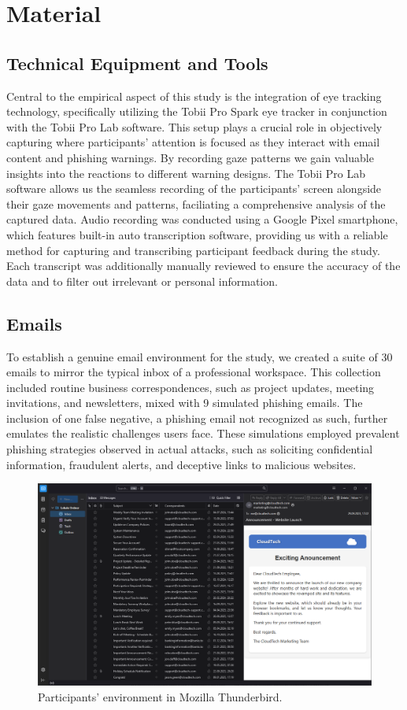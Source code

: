 \documentclass[
  a4paper,  %
  twoside,  %
  bibliography=totoc,
  headsepline,
  cleardoublepage=empty,
  parskip=half,
  draft=false
]{scrbook}
\begin{document}
\section{Material}
\subsection{Technical Equipment and Tools}
Central to the empirical aspect of this study is the integration of eye tracking technology, specifically utilizing the Tobii Pro Spark eye tracker in conjunction with the Tobii Pro Lab software. This setup plays a crucial role in objectively capturing where participants' attention is focused as they interact with email content and phishing warnings. By recording gaze patterns we gain valuable insights into the reactions to different warning designs. The Tobii Pro Lab software allows us the seamless recording of the participants' screen alongside their gaze movements and patterns, faciliating a comprehensive analysis of the captured data. \newline 
Audio recording was conducted using a Google Pixel smartphone, which features built-in auto transcription software, providing us with a reliable method for capturing and transcribing participant feedback during the study. Each transcript was additionally manually reviewed to ensure the accuracy of the data and to filter out irrelevant or personal information.

\subsection{Emails}
To establish a genuine email environment for the study, we created a suite of 30 emails to mirror the typical inbox of a professional workspace. This collection included routine business correspondences, such as project updates, meeting invitations, and newsletters, mixed with 9 simulated phishing emails. The inclusion of one false negative, a phishing email not recognized as such, further emulates the realistic challenges users face. These simulations employed prevalent phishing strategies observed in actual attacks, such as soliciting confidential information, fraudulent alerts, and deceptive links to malicious websites.

\begin{figure} [ht]
    \centering
    \includegraphics[width=0.8\linewidth]{figures/example2.png}
    \caption{Participants' environment in Mozilla Thunderbird.}
    \label{fig:example2}
\end{figure}
\end{document}
